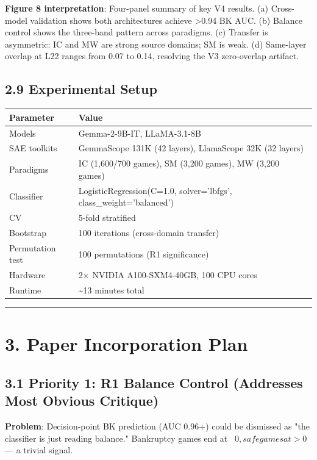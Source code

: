 \documentclass[11pt,a4paper]{article}
\begin{document}
\textbf{Figure 8 interpretation}: Four-panel summary of key V4 results. (a) Cross-model validation shows both architectures achieve >0.94 BK AUC. (b) Balance control shows the three-band pattern across paradigms. (c) Transfer is asymmetric: IC and MW are strong source domains; SM is weak. (d) Same-layer overlap at L22 ranges from 0.07 to 0.14, resolving the V3 zero-overlap artifact.

\subsection{2.9 Experimental Setup}

\begin{table}[htbp]
\centering
\footnotesize
\begin{tabular}{|l|l|}
\hline
Parameter & Value \\
\hline
Models & Gemma-2-9B-IT, LLaMA-3.1-8B \\
SAE toolkits & GemmaScope 131K (42 layers), LlamaScope 32K (32 layers) \\
Paradigms & IC (1,600/700 games), SM (3,200 games), MW (3,200 games) \\
Classifier & LogisticRegression(C=1.0, solver='lbfgs', class\_weight='balanced') \\
CV & 5-fold stratified \\
Bootstrap & 100 iterations (cross-domain transfer) \\
Permutation test & 100 permutations (R1 significance) \\
Hardware & 2× NVIDIA A100-SXM4-40GB, 100 CPU cores \\
Runtime & \textasciitilde{}13 minutes total \\
\hline
\end{tabular}
\end{table}

\bigskip\hrule\bigskip

\section{3. Paper Incorporation Plan}

\subsection{3.1 Priority 1: R1 Balance Control (Addresses Most Obvious Critique)}

\textbf{Problem}: Decision-point BK prediction (AUC 0.96+) could be dismissed as "the classifier is just reading balance." Bankruptcy games end at ~$0, safe games at >$0 — a trivial signal.
\end{document}
